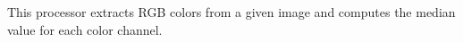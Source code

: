 This processor extracts RGB colors from a given image and computes the median value for each color channel.